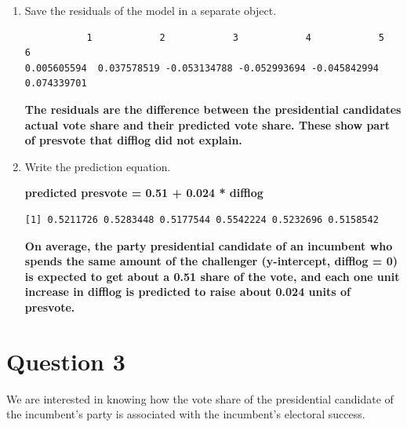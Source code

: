 \documentclass[12pt,letterpaper]{article}
\begin{document}
\begin{enumerate}
\item Save the residuals of the model in a separate object.
	
		
		\begin{verbatim}
           1            2            3            4            5            6 
0.005605594  0.037578519 -0.053134788 -0.052993694 -0.045842994  0.074339701 
		\end{verbatim}	
		\textbf{The residuals are the difference between the presidential candidates actual vote share and their predicted vote share. These show part of presvote that difflog did not explain. }
		
\item Write the prediction equation.
		
		\textbf{predicted presvote = 0.51 + 0.024 * difflog}
		
		\begin{verbatim}
[1] 0.5211726 0.5283448 0.5177544 0.5542224 0.5232696 0.5158542
		\end{verbatim}
		\textbf{On average, the party presidential candidate of an incumbent who spends the same amount of the challenger (y-intercept, difflog = 0) is expected to get about a 0.51 share of the vote, and each one unit increase in difflog is predicted to raise about 0.024 units of presvote.}
		
	\end{enumerate}

	\newpage	
\section*{Question 3}

\noindent We are interested in knowing how the vote share of the presidential candidate of the incumbent's party is associated with the incumbent's electoral success.
\end{document}
